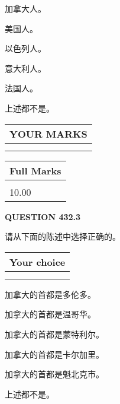 \documentclass{ctexart}
\begin{document}
 
加拿大人。
 
 
美国人。
 
 
以色列人。
 
 
意大利人。
 
 
法国人。
 
 
 上述都不是。
 
 
  
\vspace{0.2in}
  
\noindent\begin{tabular}{|l|}
\hline
 YOUR MARKS  \\
\hline
 \\ 
 \\ 
\hline
\end{tabular}
\hspace{0.05in} \begin{tabular}{|l|}
\hline
 Full Marks  \\
\hline
 \\ 
10.00 \\
\hline
\end{tabular}
{\textbf{\Large{QUESTION
432.3 
}}}
  
  
请从下面的陈述中选择正确的。
  
  
\noindent\hspace{3.0in} \begin{tabular}{|l|}
\hline
Your choice \\
\hline
 \\ 
 \\ 
\hline
\end{tabular}
  
  
 
 
加拿大的首都是多伦多。
 
 
加拿大的首都是温哥华。
 
 
加拿大的首都是蒙特利尔。
 
 
加拿大的首都是卡尔加里。
 
 
加拿大的首都是魁北克市。
 
 
 上述都不是。
 
 
  
\vspace{0.2in}
  
\end{document}
